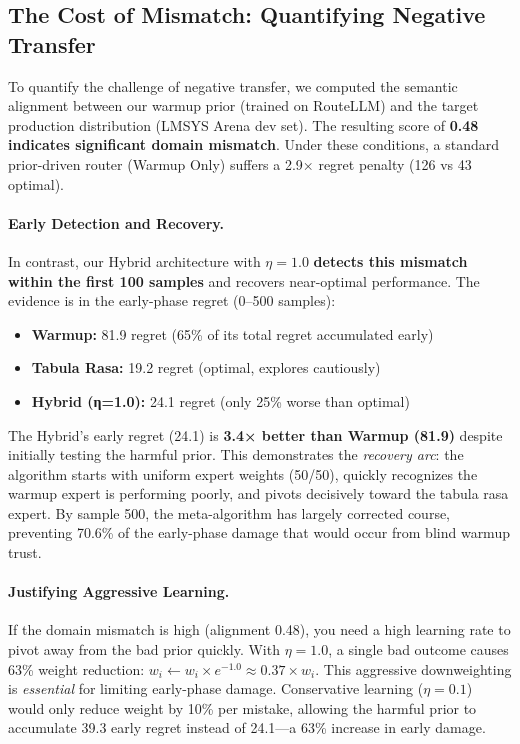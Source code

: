 \subsection{The Cost of Mismatch: Quantifying Negative Transfer}

To quantify the challenge of negative transfer, we computed the semantic alignment between our warmup prior (trained on RouteLLM) and the target production distribution (LMSYS Arena dev set). The resulting score of \textbf{0.48 indicates significant domain mismatch}. Under these conditions, a standard prior-driven router (Warmup Only) suffers a 2.9× regret penalty (126 vs 43 optimal). 

\paragraph{Early Detection and Recovery.}
In contrast, our Hybrid architecture with $\eta=1.0$ \textbf{detects this mismatch within the first 100 samples} and recovers near-optimal performance. The evidence is in the early-phase regret (0--500 samples):

\begin{itemize}[leftmargin=*,nosep]
    \item \textbf{Warmup:} 81.9 regret (65\% of its total regret accumulated early)
    \item \textbf{Tabula Rasa:} 19.2 regret (optimal, explores cautiously)
    \item \textbf{Hybrid (η=1.0):} 24.1 regret (only 25\% worse than optimal)
\end{itemize}

The Hybrid's early regret (24.1) is \textbf{3.4× better than Warmup (81.9)} despite initially testing the harmful prior. This demonstrates the \emph{recovery arc}: the algorithm starts with uniform expert weights (50/50), quickly recognizes the warmup expert is performing poorly, and pivots decisively toward the tabula rasa expert. By sample 500, the meta-algorithm has largely corrected course, preventing 70.6\% of the early-phase damage that would occur from blind warmup trust.

\paragraph{Justifying Aggressive Learning.}
If the domain mismatch is high (alignment 0.48), you need a high learning rate to pivot away from the bad prior quickly. With $\eta=1.0$, a single bad outcome causes 63\% weight reduction: $w_i \leftarrow w_i \times e^{-1.0} \approx 0.37 \times w_i$. This aggressive downweighting is \emph{essential} for limiting early-phase damage. Conservative learning ($\eta=0.1$) would only reduce weight by 10\% per mistake, allowing the harmful prior to accumulate 39.3 early regret instead of 24.1—a 63\% increase in early damage.

